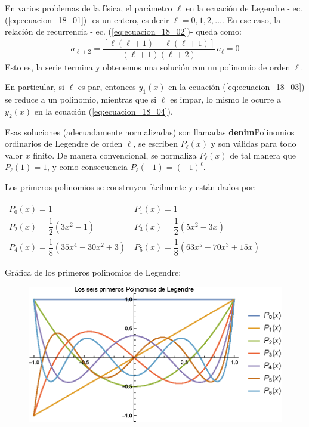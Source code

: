 \documentclass[12pt]{article}
\numberwithin{equation}{section}
\begin{document}
En varios problemas de la física, el parámetro $\ell$ en la ecuación de Legendre - ec. (\ref{eq:ecuacion_18_01})- es un entero, es decir $\ell = 0,1,2,\ldots$. En ese caso, la relación de recurrencia - ec. (\ref{eq:ecuacion_18_02})- queda como:
\begin{align*}
a_{\ell + 2} = \dfrac{[ \ell (\ell + 1) - \ell (\ell + 1) ]}{(\ell + 1)(\ell + 2)} \, a_{\ell} = 0
\end{align*}
Esto es, la serie termina y obtenemos una solución con un polinomio de orden $\ell$.
\par
En particular, si $\ell$ es par, entonces $y_{1} (x)$ en la ecuación (\ref{eq:ecuacion_18_03}) se reduce a un polinomio,  mientras que si $\ell$ es impar, lo mismo le ocurre a $y_{2} (x)$ en la ecuación (\ref{eq:ecuacion_18_04}).
\par
Esas soluciones (adecuadamente normalizadas) son llamadas \textbf{denim}{Polinomios ordinarios de Legendre de orden $\ell$}, se escriben $P_{\ell} (x)$ y son válidas para todo valor $x$ finito. De manera convencional, se normaliza $P_{\ell} (x)$ de tal manera que $P_{\ell}(1) =  1$, y como consecuencia $P_{\ell} (-1) = (-1)^{\ell}$.
\par
Los primeros polinomios se construyen fácilmente y están dados por:
\begin{center}
\begin{tabular}{l l}
$P_{0} (x) {=} 1 $ & $P_{1}(x) {=} 1 $ \\[0.5em]
$P_{2} (x) {=} \dfrac{1}{2} (3 x^{2} {-} 1)$ & $P_{3} (x) {=} \dfrac{1}{2} (5 x^{2} {-} 3 x)$ \\[0.5em] 
$P_{4} (x) {=} \dfrac{1}{8} (35 x^{4} {-} 30 x^{2} {+} 3)$ & $P_{5} (x) {=} \dfrac{1}{8} (63 x^{5} {-} 70 x^{3} + 15 x)$
\end{tabular}
\end{center}
Gráfica de los primeros polinomios de Legendre:
\begin{figure}[H]
    \centering
    \includegraphics[scale=0.9]{Imagenes/Plot_Lagrange_0-6.eps}
\end{figure}
\end{document}
